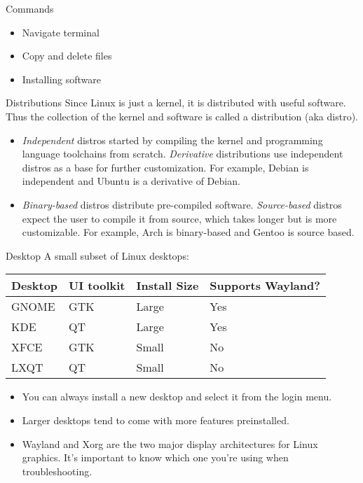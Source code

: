 \documentclass[presentation]{beamer}
\begin{document}
\begin{frame}[label={sec:org788a7f4}]{Commands}
\begin{itemize}
\item Navigate terminal
\item Copy and delete files
\item Installing software
\end{itemize}
\end{frame}

\begin{frame}[label={sec:org1454ab8}]{Distributions}
Since Linux is just a kernel, it is distributed with useful software. Thus the collection of the kernel and software is called a distribution (aka distro).

\begin{itemize}
\item \emph{Independent} distros started by compiling the kernel and programming language toolchains from scratch. \emph{Derivative} distributions use independent distros as a base for further customization. For example, Debian is independent and Ubuntu is a derivative of Debian.
\item \emph{Binary-based} distros distribute pre-compiled software. \emph{Source-based} distros expect the user to compile it from source, which takes longer but is more customizable. For example, Arch is binary-based and Gentoo is source based.
\end{itemize}
\end{frame}

\begin{frame}[label={sec:org0f4b767}]{Desktop}
A small subset of Linux desktops:

\begin{center}
\begin{tabular}{llll}
Desktop & UI toolkit & Install Size & Supports Wayland?\\
\hline
GNOME & GTK & Large & Yes\\
KDE & QT & Large & Yes\\
XFCE & GTK & Small & No\\
LXQT & QT & Small & No\\
\end{tabular}
\end{center}

\begin{itemize}
\item You can always install a new desktop and select it from the login menu.
\item Larger desktops tend to come with more features preinstalled.
\item Wayland and Xorg are the two major display architectures for Linux graphics. It's important to know which one you're using when troubleshooting.
\end{itemize}
\end{frame}
\end{document}
